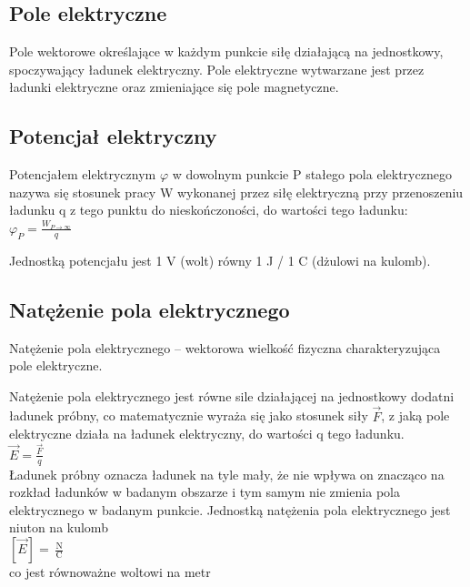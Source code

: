 \documentclass[a4paper,12pt]{article}
\begin{document}
\begin{justify}

\label{theory}

\subsection{Pole elektryczne}

Pole wektorowe określające w każdym punkcie siłę działającą na jednostkowy, spoczywający ładunek elektryczny. Pole elektryczne wytwarzane jest przez ładunki elektryczne oraz zmieniające się pole magnetyczne. \cite{pe} 

\subsection{Potencjał elektryczny}

Potencjałem elektrycznym $\varphi$  w dowolnym punkcie P stałego pola elektrycznego nazywa się stosunek pracy W wykonanej przez siłę elektryczną przy przenoszeniu ładunku q z tego punktu do nieskończoności, do wartości tego ładunku: \\
$\varphi _{{P}}={\frac  {W_{{P\rightarrow \infty }}}{q}}$

Jednostką potencjału jest 1 V (wolt) równy 1 J / 1 C (dżulowi na kulomb). \cite{pote}

\subsection{Natężenie pola elektrycznego}

Natężenie pola elektrycznego – wektorowa wielkość fizyczna charakteryzująca pole elektryczne.

Natężenie pola elektrycznego jest równe sile działającej na jednostkowy dodatni ładunek próbny, co matematycznie wyraża się jako stosunek siły $\vec  {F}$, z jaką pole elektryczne działa na ładunek elektryczny, do wartości q tego ładunku. \\

$\vec {E}=\frac {\vec {F}}{q}$ \\

Ładunek próbny oznacza ładunek na tyle mały, że nie wpływa on znacząco na rozkład ładunków w badanym obszarze i tym samym nie zmienia pola elektrycznego w badanym punkcie.
Jednostką natężenia pola elektrycznego jest niuton na kulomb \\

$ \left[{\vec {E}}\right]={\frac {\operatorname {N} }{\operatorname {C} }}$ \\
co jest równoważne woltowi na metr \\


\end{justify}
\end{document}

